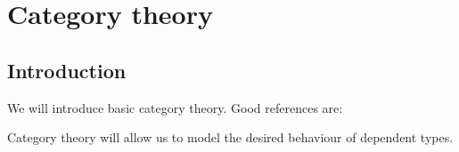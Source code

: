 

\section{Category theory}

\subsection{Introduction}



 

We will introduce basic category theory. Good references are: \cite{category, BarrWellsCTCS, MacLaneSaunders1998Cftw,rotman2008introduction}

Category theory will allow us to model the desired behaviour of dependent types. 


